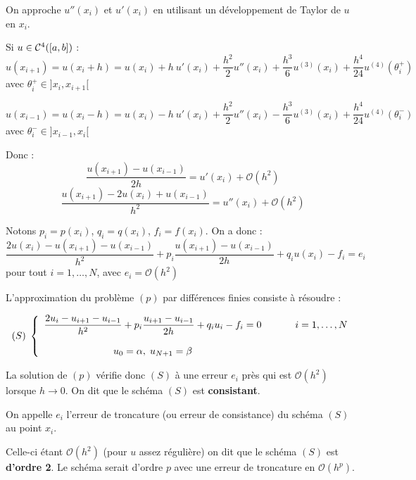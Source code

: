 On approche $u''(x_i)$ et $u'(x_i)$ en utilisant un développement de Taylor
de $u$ en $x_i$.

Si $u \in \mathcal{C}^4([a,b])$ :
\[
    u(x_{i+1}) = u(x_i + h) = u(x_i) + h \: u'(x_i) + \frac{h^2}{2} u''(x_i)
    + \frac{h^3}{6} u^{(3)}(x_i) + \frac{h^4}{24} u^{(4)}(\theta_i^+)
\]
\hfill avec $\theta_i^+ \in ]x_i,x_{i+1}[$

\[
    u(x_{i-1}) = u(x_i - h) = u(x_i) - h \: u'(x_i) + \frac{h^2}{2} u''(x_i)
    - \frac{h^3}{6} u^{(3)}(x_i) + \frac{h^4}{24} u^{(4)}(\theta_i^-)
\]
\hfill avec $\theta_i^- \in ]x_{i-1},x_i[$

    Donc :
    \[
        \frac{u(x_{i+1}) - u(x_{i-1})}{2h} =  u'(x_i) + \mathcal{O}(h^2)
    \]
    \[
        \frac{u(x_{i+1}) - 2u(x_i) + u(x_{i-1})}{h^2} =  u''(x_i) + \mathcal{O}(h^2)
    \]

    Notons $p_i = p(x_i)$, $q_i = q(x_i)$, $f_i = f(x_i)$. On a donc :
    \[
        \frac{2u(x_i) - u(x_{i+1}) - u(x_{i-1})}{h^2} + p_i \frac{u(x_{i+1}) - u(x_{i-1})}{2h} + q_i u(x_i) - f_i = e_i
    \]
    \hfill pour tout $i=1,\dots,N$, avec $e_i = \mathcal{O}(h^2)$

    L'approximation du problème $(p)$ par différences finies consiste à
    résoudre :

    \[
        (S) \;
        \left\lbrace
        \begin{array}{ccc}
            \dfrac{2u_i - u_{i+1} - u_{i-1}}{h^2} + p_i \dfrac{u_{i+1} - u_{i-1}}{2h} + q_i u_i - f_i = 0 & & \hspace{0.5cm} i=1,\dots,N \\ [15pt]
            u_0 = \alpha, \; u_{N+1} = \beta & &
        \end{array}
        \right.
    \]

    La solution de $(p)$ vérifie donc $(S)$ à une erreur $e_i$ près qui est
    $\mathcal{O}(h^2)$ lorsque $h \longrightarrow 0$. On dit que le schéma
    $(S)$ est \textbf{consistant}.

    On appelle $e_i$ l'erreur de troncature (ou erreur de consistance) du schéma
    $(S)$ au point $x_i$.

    Celle-ci étant $\mathcal{O}(h^2)$ (pour $u$ assez régulière) on dit que le schéma
    $(S)$ est \textbf{d'ordre 2}. Le schéma serait d'ordre $p$ avec une erreur
    de troncature en $\mathcal{O}(h^p)$.


